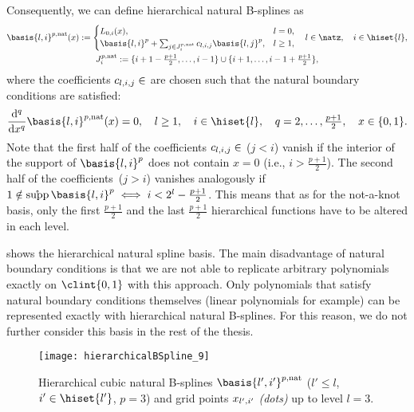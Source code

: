 Consequently, we can define hierarchical natural B-splines as
\begin{subequations}
  \begin{gather}
    \basis{l,i}^{p,\ntrl}(x)
    :=
    \begin{cases}
      L_{0,i}(x),&
      l = 0,\\
      \basis{l,i}^p +
      \sum_{j \in J_i^{p,\ntrl}} c_{l,i,j} \basis{l,j}^p,&
      l \ge 1,
    \end{cases}\quad
    l \in \natz,\quad
    i \in \hiset{l},\\
    J_i^{p,\ntrl}
    := \{i+1-\tfrac{p+1}{2}, \dotsc, i-1\} \cup
    \{i+1, \dotsc, i-1+\tfrac{p+1}{2}\},
  \end{gather}
\end{subequations}
where the coefficients $c_{l,i,j} \in \real$ are chosen such that
the natural boundary conditions are satisfied:
\begin{equation}
  \frac{\diff^q}{\dx^q} \basis{l,i}^{p,\ntrl}(x)
  = 0,\quad
  l \ge 1,\quad
  i \in \hiset{l},\quad
  q = 2, \dotsc, \tfrac{p+1}{2},\quad
  x \in \{0, 1\}.
\end{equation}
Note that the first half of the coefficients $c_{l,i,j} \in \real$
($j < i$) vanish if the interior of the support of $\basis{l,i}^p$
does not contain $x = 0$
(i.e., $i > \tfrac{p+1}{2}$).
The second half of the coefficients~($j > i$) vanishes analogously
if $1 \notin \interiorsupp \basis{l,i}^p \iff i < 2^l - \tfrac{p+1}{2}$.
This means that as for the not-a-knot basis,
only the first $\tfrac{p+1}{2}$ and the last $\tfrac{p+1}{2}$
hierarchical functions have to be altered in each level.

 shows the hierarchical natural spline basis.
The main disadvantage of natural boundary conditions is that
we are not able to replicate arbitrary polynomials exactly on $\clint{0, 1}$
with this approach.
Only polynomials that satisfy natural boundary conditions themselves
(linear polynomials for example)
can be represented exactly with hierarchical natural B-splines.
For this reason, we do not further consider this basis in the
rest of the thesis.

\begin{SCfigure}
  \texttt{[image: hierarchicalBSpline\_9]}%
  \caption{%
    Hierarchical cubic natural B-splines
    $\basis{l',i'}^{p,\ntrl}$
    ($l' \le l$, $i' \in \hiset{l'}$, $p = 3$) and
    grid points $x_{l',i'}$ \emph{(dots)} up to level $l = 3$.%
  }%
  \label{fig:naturalBSpline}%
\end{SCfigure}
